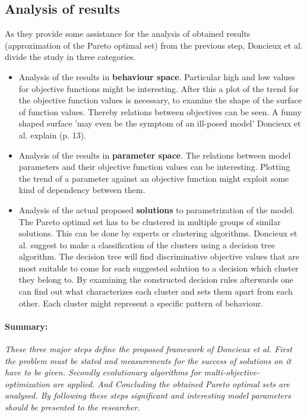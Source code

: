 \documentclass[12pt,twoside]{article}
\theoremstyle{plain}
\theoremstyle{definition}
\theoremstyle{remark}
\begin{document}
\subsection{Analysis of results}
As they provide some assistance for the analysis of obtained results (approximation of the Pareto optimal set) from the previous step, Doncieux et al. divide the study in three categories.
\begin{itemize}
	\item Analysis of the results in \textbf{behaviour space}. Particular high and low values for objective functions might be interesting. After this a plot of the trend for the objective function values is necessary, to examine the shape of the surface of function values. Thereby relations between objectives can be seen. A funny shaped surface 'may even be the symptom of an ill-posed model' Doncieux et al. explain \cite{doncieux2015multi} (p. 13).
	\item Analysis of the results in \textbf{parameter space}. The relations between model parameters and their objective function values can be interesting. Plotting the trend of a parameter against an objective function might exploit some kind of dependency between them.
	\item Analysis of the actual proposed \textbf{solutions} to parametrization of the model. The Pareto optimal set has to be clustered in multiple groups of similar solutions. This can be done by experts or clustering algorithms.
	Doncieux et al. suggest to make a classification of the clusters using a decision tree algorithm. The decision tree will find discriminative objective values that are most suitable to come for each suggested solution to a decision which cluster they belong to.
	By examining the constructed decision rules afterwards one can find out what characterizes each cluster and sets them apart from each other. Each cluster might represent a specific pattern of behaviour.
\end{itemize}

\paragraph{Summary:}
\textit{
	These three major steps define the proposed framework of Doncieux et al.
	First the problem must be stated and measurements for the success of solutions on it have to be given. Secondly evolutionary algorithms for multi-objective-optimization are applied. And Concluding the obtained Pareto optimal sets are analysed.
	By following these steps significant and interesting model parameters should be presented to the researcher.
}
\end{document}
